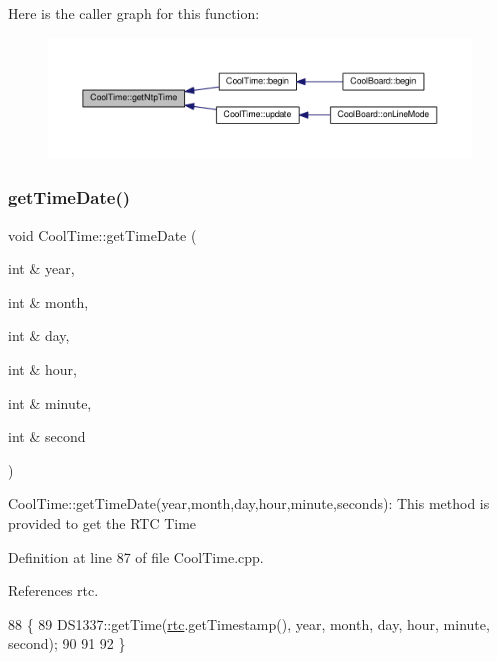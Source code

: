 Here is the caller graph for this function\+:
\nopagebreak
\begin{figure}[H]
\begin{center}
\leavevmode
\includegraphics[width=350pt]{classCoolTime_a41fbbbfd651c2079f54d4b2911e4c705_icgraph}
\end{center}
\end{figure}
\mbox{\label{classCoolTime_a52a1503ad5cb540c71c44cfeceaead8a}} 
\subsubsection{\texorpdfstring{get\+Time\+Date()}{getTimeDate()}}
{\footnotesize\ttfamily void Cool\+Time\+::get\+Time\+Date (\begin{DoxyParamCaption}\item[{int \&}]{year,  }\item[{int \&}]{month,  }\item[{int \&}]{day,  }\item[{int \&}]{hour,  }\item[{int \&}]{minute,  }\item[{int \&}]{second }\end{DoxyParamCaption})}

Cool\+Time\+::get\+Time\+Date(year,month,day,hour,minute,seconds)\+: This method is provided to get the R\+TC Time 

Definition at line 87 of file Cool\+Time.\+cpp.



References rtc.


\begin{DoxyCode}
88 \{   
89  DS1337::getTime(\hyperlink{classCoolTime_afa77d58c0c21cfe8b7c27e34d82f07b9}{rtc}.getTimestamp(),  year,  month,  day,  hour,  minute,  second);
90     
91 
92 \}
\end{DoxyCode}
\mbox{\label{classCoolTime_a5ae038a4498602b189f76a10bf02adf8}} 
